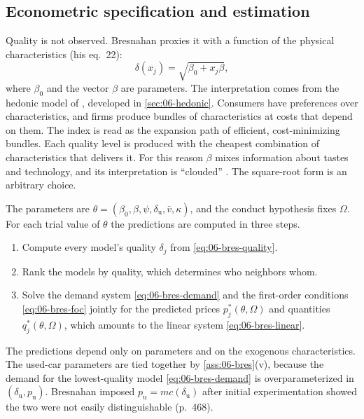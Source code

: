 \subsection{Econometric specification and estimation}\label{sec:06-bres-estimation}

Quality is not observed. Bresnahan proxies it with a function of the physical characteristics (his eq.~22):
\begin{equation}\label{eq:06-bres-quality}
  \delta(x_j) = \sqrt{\beta_0 + x_j\beta},
\end{equation}
where $\beta_0$ and the vector $\beta$ are parameters. The interpretation comes from the hedonic model of
\citet{Rosen1974}, developed in \cref{sec:06-hedonic}. Consumers have preferences over characteristics, and firms
produce bundles of characteristics at costs that depend on them. The index is read as the expansion path of
efficient, cost-minimizing bundles. Each quality level is produced with the cheapest combination of characteristics
that delivers it. For this reason $\beta$ mixes information about tastes and technology, and its interpretation is
``clouded'' \citep[p.~467]{Bresnahan1987}. The square-root form is an arbitrary choice.

The parameters are $\theta = (\beta_0, \beta, \psi, \delta_{\mathrm u}, \bar v, \kappa)$, and the conduct hypothesis
fixes $\Omega$. For each trial value of $\theta$ the predictions are computed in three steps.
\begin{enumerate}
\item Compute every model's quality $\delta_j$ from \eqref{eq:06-bres-quality}.
\item Rank the models by quality, which determines who neighbors whom.
\item Solve the demand system \eqref{eq:06-bres-demand} and the first-order conditions \eqref{eq:06-bres-foc}
jointly for the predicted prices $p^*_j(\theta,\Omega)$ and quantities $q^*_j(\theta,\Omega)$, which amounts to the
linear system \eqref{eq:06-bres-linear}.
\end{enumerate}
The predictions depend only on parameters and on the exogenous characteristics. The used-car parameters are tied
together by \cref{ass:06-bres}(v), because the demand for the lowest-quality model \eqref{eq:06-bres-demand} is
overparameterized in $(\delta_{\mathrm u}, p_{\mathrm u})$. Bresnahan imposed $p_{\mathrm u} = mc(\delta_{\mathrm u})$
after initial experimentation showed the two were not easily distinguishable (p.~468).

